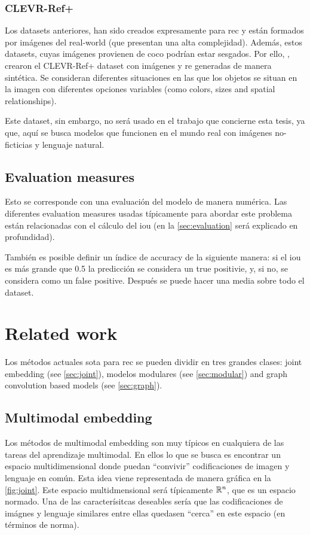 \subsubsection{CLEVR-Ref+}
Los datasets anteriores, han sido creados expresamente para \gls{rec} y están
formados por imágenes del real-world (que presentan una alta
complejidad). Además, estos datasets, cuyas imágenes provienen de \gls{coco}
podrían estar sesgados. Por ello, , crearon el CLEVR-Ref+
dataset con imágenes y \gls{re} generadas de manera sintética. Se consideran
diferentes situaciones en las que los objetos se situan en la imagen con
diferentes opciones variables (como colors, sizes and spatial relationships).

Este dataset, sin embargo, no será usado en el trabajo que concierne esta
tesis, ya que, aquí se busca modelos que funcionen en el mundo real con
imágenes no-ficticias y lenguaje natural.

\subsection{Evaluation measures} \label{sec:eval-measure}

Esto se corresponde con una evaluación del modelo de manera numérica. Las
diferentes evaluation measures usadas típicamente para abordar este problema
están relacionadas con el cálculo del \gls{iou} (en la \vref{sec:evaluation}
será explicado en profundidad).

También es posible definir un índice de accuracy de la siguiente manera: si el
\gls{iou} es más grande que \num{0.5} la predicción se considera un true
positivie, y, si no, se considera como un false positive. Después se puede
hacer una media sobre todo el dataset.


\section{Related work} \label{sec:sota}

Los métodos actuales \gls{sota} para \gls{rec} se pueden dividir en tres
grandes clases: joint embedding (see \vref{sec:joint}), modelos modulares (see
\vref{sec:modular}) and graph convolution based models (see
\vref{sec:graph}).

\subsection{Multimodal embedding} \label{sec:joint} Los métodos de multimodal
embedding son muy típicos en cualquiera de las tareas del aprendizaje
multimodal. En ellos lo que se busca es encontrar un espacio multidimensional
donde puedan ``convivir'' codificaciones de imagen y lenguaje en común. Esta
idea viene representada de manera gráfica en la \vref{fig:joint}. Este espacio
multidmensional será típicamente \(\mathbb{R}^n\), que es un espacio normado. Una de
las caracterísitcas deseables sería que las codificaciones de imágnes y
lenguaje similares entre ellas quedasen ``cerca'' en este espacio (en términos
de norma).

